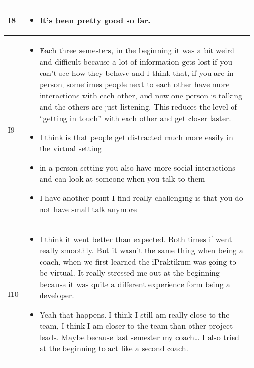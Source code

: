\begin{longtable}{|  p{}  |  p{} |}
    \\
\hline
\vspace{-0.5cm} I8 & 
    \begin{itemize}
    \vspace{-0.5cm} \item It's been pretty good so far.
    \end{itemize}
    \\
\hline
\vspace{-0.5cm} I9 &
    \begin{itemize}
   \vspace{-0.5cm} \item Each three semesters, in the beginning it was a bit weird and difficult because a lot of information gets lost if you can’t see how they behave and I think that, if you are in person, sometimes people next to each other have more interactions with each other, and now one person is talking and the others are just listening. This reduces the level of “getting in touch” with each other and get closer faster.
    \vspace{-0.3cm} \item I think is that people get distracted much more easily in the virtual setting
    \vspace{-0.3cm} \item  in a person setting you also have more social interactions and can look at someone when you talk to them
      \vspace{-0.3cm} \item I have another point I find really challenging is that you do not have small talk anymore
    \end{itemize}
  \\
\hline
\vspace{-0.5cm} I10 & 
    \begin{itemize}
    \vspace{-0.5cm} \item I think it went better than expected. Both times if went really smoothly. But it wasn’t the same thing when being a coach, when we first learned the iPraktikum was going to be virtual. It really stressed me out at the beginning because it was quite a different experience form being a developer.
    \vspace{-0.3cm} \item Yeah that happens. I think I still am really close to the team, I think I am closer to the team than other project leads. Maybe because last semester my coach… I also tried at the beginning to act like a second coach. 
    \end{itemize}
     \\
\hline
\end{longtable}



